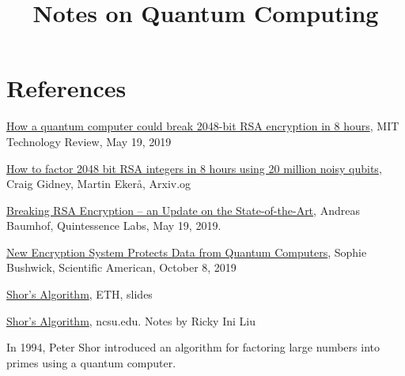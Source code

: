 \title{Notes on Quantum Computing}

\maketitle


\section{References}

\href{https://www.technologyreview.com/2019/05/30/65724/how-a-quantum-computer-could-break-2048-bit-rsa-encryption-in-8-hours/}{How a quantum computer could break 2048-bit RSA encryption in 8 hours}, MIT Technology Review, May 19, 2019

\href{https://arxiv.org/abs/1905.09749}{
How to factor 2048 bit RSA integers in 8 hours using 20 million noisy qubits}, Craig Gidney, Martin Ekerå, Arxiv.og

\href{https://www.quintessencelabs.com/blog/breaking-rsa-encryption-update-state-art/}{Breaking RSA Encryption – an Update on the State-of-the-Art}, Andreas Baumhof, Quintessence Labs, May 19, 2019.

\href{https://www.scientificamerican.com/article/new-encryption-system-protects-data-from-quantum-computers/}{New Encryption System Protects Data from Quantum Computers}, Sophie Bushwick, Scientific American, October 8, 2019

\href{https://qudev.phys.ethz.ch/static/content/QSIT15/Shors%20Algorithm.pdf}{Shor's Algorithm}, ETH, slides


\href{https://riliu.math.ncsu.edu/437/notes3se4.html}{Shor's Algorithm}, ncsu.edu. Notes by Ricky Ini Liu 


In 1994, Peter Shor introduced an algorithm for factoring large numbers into primes using a quantum computer.  

